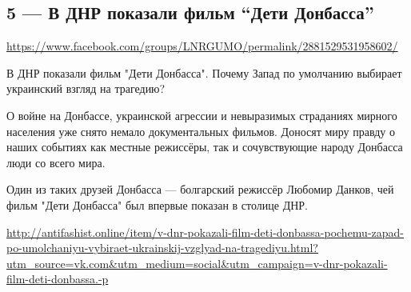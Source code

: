  
 
  
\clearpage
\subsection{5 --- В ДНР показали фильм ``Дети Донбасса''}
\label{sec:27_07_2020.fb.lnr.5}
\url{https://www.facebook.com/groups/LNRGUMO/permalink/2881529531958602/}
  
В ДНР показали фильм "Дети Донбасса". Почему Запад по умолчанию выбирает
украинский взгляд на трагедию?

О войне на Донбассе, украинской агрессии и невыразимых страданиях мирного
населения уже снято немало документальных фильмов. Доносят миру правду о наших
событиях как местные режиссёры, так и сочувствующие народу Донбасса люди со
всего мира.

Один из таких друзей Донбасса --- болгарский режиссёр Любомир Данков, чей фильм
"Дети Донбасса" был впервые показан в столице ДНР.

\url{http://antifashist.online/item/v-dnr-pokazali-film-deti-donbassa-pochemu-zapad-po-umolchaniyu-vybiraet-ukrainskij-vzglyad-na-tragediyu.html?utm_source=vk.com&utm_medium=social&utm_campaign=v-dnr-pokazali-film-deti-donbassa.-p}
